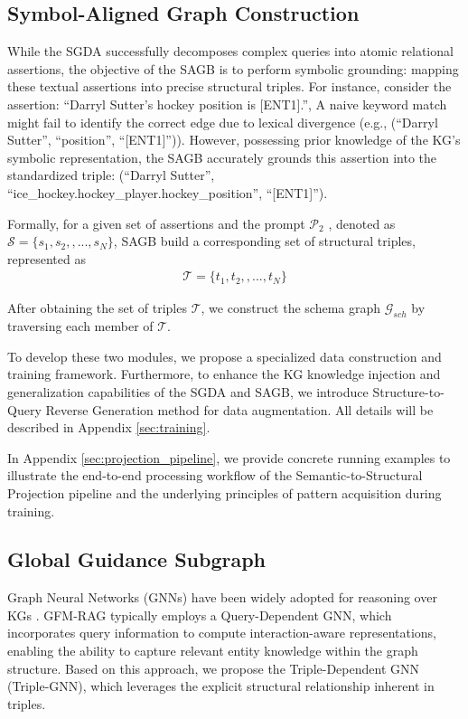 \documentclass[11pt]{article}
\begin{document}
\subsection{Symbol-Aligned Graph Construction}
\label{subsec:SAGB}

While the SGDA successfully decomposes complex queries into atomic relational assertions, the objective of the SAGB is to perform symbolic grounding: mapping these textual assertions into precise structural triples. For instance, consider the assertion: ``Darryl Sutter's hockey position is [ENT1].'', A naive keyword match might fail to identify the correct edge due to lexical divergence (e.g., (``Darryl Sutter'', ``position'', ``[ENT1]'')). However, possessing prior knowledge of the KG's symbolic representation, the SAGB accurately grounds this assertion into the standardized triple: (``Darryl Sutter'', ``ice\_hockey.hockey\_player.hockey\_position'', ``[ENT1]'').

Formally, for a given set of assertions and the prompt \hyperref[fig:p2]{$ \mathcal{P}_2 $} , denoted as \(\mathcal{S} = \{ s_1, s_2, , ... , s_N \}\), SAGB build a corresponding set of structural triples, represented as
\begin{align}
\mathcal{T} = \{ t_1, t_2, , ... , t_N \}
\end{align}

After obtaining the set of triples $\mathcal{T}$, we construct the schema graph $\mathcal{G}_{sch}$ by traversing each member of $\mathcal{T}$. 

To develop these two modules, we propose a specialized data construction and training framework. Furthermore, to enhance the KG knowledge injection and generalization capabilities of the SGDA and SAGB, we introduce Structure-to-Query Reverse Generation method for data augmentation. All details will be described in Appendix \ref{sec:training}. 

In Appendix \ref{sec:projection_pipeline}, we provide concrete running examples to illustrate the end-to-end processing workflow of the Semantic-to-Structural Projection pipeline and the underlying principles of pattern acquisition during training.


\subsection{Global Guidance Subgraph}
\label{subsec:initial_graph_select}

Graph Neural Networks (GNNs) have been widely adopted for reasoning over KGs \cite{mavromatis-karypis-2025-gnn,yasunaga2021qa,liu2025pathmind}. GFM-RAG \cite{luo2025gfmrag_arxiv} typically employs a Query-Dependent GNN, which incorporates query information to compute interaction-aware representations, enabling the ability to capture relevant entity knowledge within the graph structure. Based on this approach, we propose the Triple-Dependent GNN (Triple-GNN), which leverages the explicit structural relationship inherent in triples.
\end{document}
